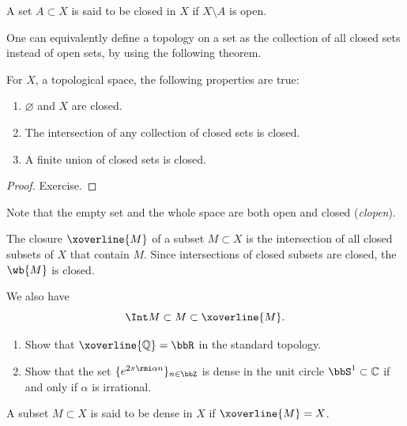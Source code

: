 \begin{defn}
A set $A\subset X$ is said to be closed in $X$ if $X\setminus A$ is open.
\end{defn}

One can equivalently define a topology on a set as the collection of all closed sets instead of open sets, by using the following theorem.

\begin{thm}
For $X$, a topological space, the following properties are true:
\begin{enumerate}
    \item $\varnothing$ and $X$ are closed.
    \item The intersection of any collection of closed sets is closed.
    \item A finite union of closed sets is closed.
\end{enumerate}
\end{thm}
\begin{proof}
Exercise.
\end{proof}

Note that the empty set and the whole space are both open and closed (\emph{clopen}).

\begin{defn}
    The closure $\xoverline{M}$ of a subset $M\subset X$ is the intersection of all closed subsets of $X$ that contain $M$. Since intersections of closed subsets are closed, the $\wb{M}$ is closed.
\end{defn}

We also have
\begin{equation}
\Int M \subset M \subset \xoverline{M}.
\end{equation}

\begin{xca}
\begin{enumerate}
    \item Show that $\xoverline{\mathbb{Q}}=\bbR $ in the standard topology.
    \item Show that the set $\{e^{2\pi\rmi \alpha n}\}_{n\in\bbZ}$ is dense in the unit circle $\bbS^1\subset \mathbb{C}$ if and only if $\alpha$ is irrational.
\end{enumerate}
\end{xca}

\begin{defn}
    A subset $M\subset X$ is said to be dense in $X$ if $\xoverline{M} = X$.
\end{defn}

